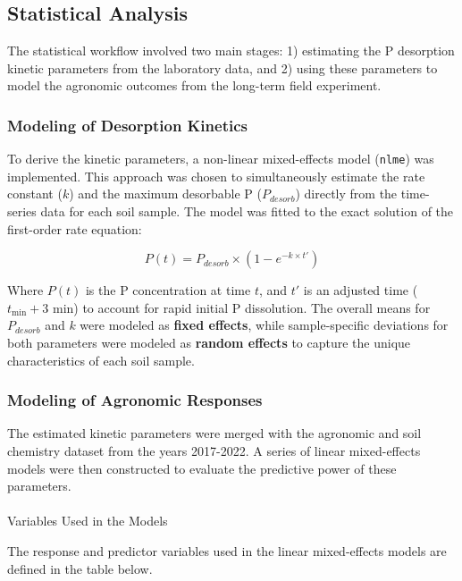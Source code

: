 \documentclass[
  a4paper,
]{article}
\makeatletter
\let\oldparagraph\paragraph
\renewcommand{\paragraph}{
    \@ifstar
      \xxxParagraphStar
      \xxxParagraphNoStar
  }
\newcommand{\xxxParagraphStar}[1]{\oldparagraph*{#1}\mbox{}}
\newcommand{\xxxParagraphNoStar}[1]{\oldparagraph{#1}\mbox{}}
\makeatother
\begin{document}
\subsection{Statistical Analysis}\label{statistical-analysis}

The statistical workflow involved two main stages: 1) estimating the P
desorption kinetic parameters from the laboratory data, and 2) using
these parameters to model the agronomic outcomes from the long-term
field experiment.

\subsubsection{Modeling of Desorption
Kinetics}\label{modeling-of-desorption-kinetics}

To derive the kinetic parameters, a non-linear mixed-effects model
(\texttt{nlme}) was implemented. This approach was chosen to
simultaneously estimate the rate constant (\(k\)) and the maximum
desorbable P (\(P_{desorb}\)) directly from the time-series data for
each soil sample. The model was fitted to the exact solution of the
first-order rate equation:

\[ P(t) = P_{desorb} \times (1 - e^{-k \times t'}) \]

Where \(P(t)\) is the P concentration at time \(t\), and \(t'\) is an
adjusted time (\(t_\text{min} + 3\) min) to account for rapid initial P
dissolution. The overall means for \(P_{desorb}\) and \(k\) were modeled
as \textbf{fixed effects}, while sample-specific deviations for both
parameters were modeled as \textbf{random effects} to capture the unique
characteristics of each soil sample.

\subsubsection{Modeling of Agronomic
Responses}\label{modeling-of-agronomic-responses}

The estimated kinetic parameters were merged with the agronomic and soil
chemistry dataset from the years 2017-2022. A series of linear
mixed-effects models were then constructed to evaluate the predictive
power of these parameters.

\paragraph{Variables Used in the
Models}\label{variables-used-in-the-models}

The response and predictor variables used in the linear mixed-effects
models are defined in the table below.
\end{document}
